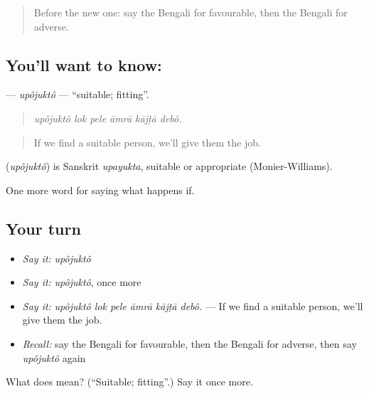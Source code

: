 \begin{quote}
Before the new one: say the Bengali for favourable, then the Bengali for adverse.
\end{quote}

\subsection*{You'll want to know: }
\textbf{} — \emph{upôjuktô} — \textquotedblleft{}suitable; fitting\textquotedblright{}.

\begin{quote}
     
\end{quote}

\begin{quote}
\emph{upôjuktô lok pele āmrā kājṭā debô.}
\end{quote}

\begin{quote}
If we find a suitable person, we'll give them the job.
\end{quote}

\begin{cousinweb}
\textbf{} (\emph{upôjuktô}) is Sanskrit \emph{upayukta}, suitable or appropriate (Monier-Williams).
\end{cousinweb}

\begin{grammarlens}[title={What you've built}]
One more word for saying what happens if.
\end{grammarlens}

\subsection*{Your turn}
\begin{itemize}
\raggedright
  \item \emph{Say it:} \emph{upôjuktô}
  \item \emph{Say it:} \emph{upôjuktô}, once more
  \item \emph{Say it:} \emph{upôjuktô lok pele āmrā kājṭā debô.} — If we find a suitable person, we'll give them the job.
  \item \emph{Recall:} say the Bengali for favourable, then the Bengali for adverse, then say \emph{upôjuktô} again
\end{itemize}

\begin{tcolorbox}[breakable,colback=teal!4,colframe=teal!35!black,title={Before you move on}]
What does  mean? (\textquotedblleft{}Suitable; fitting\textquotedblright{}.) Say it once more.
\end{tcolorbox}
